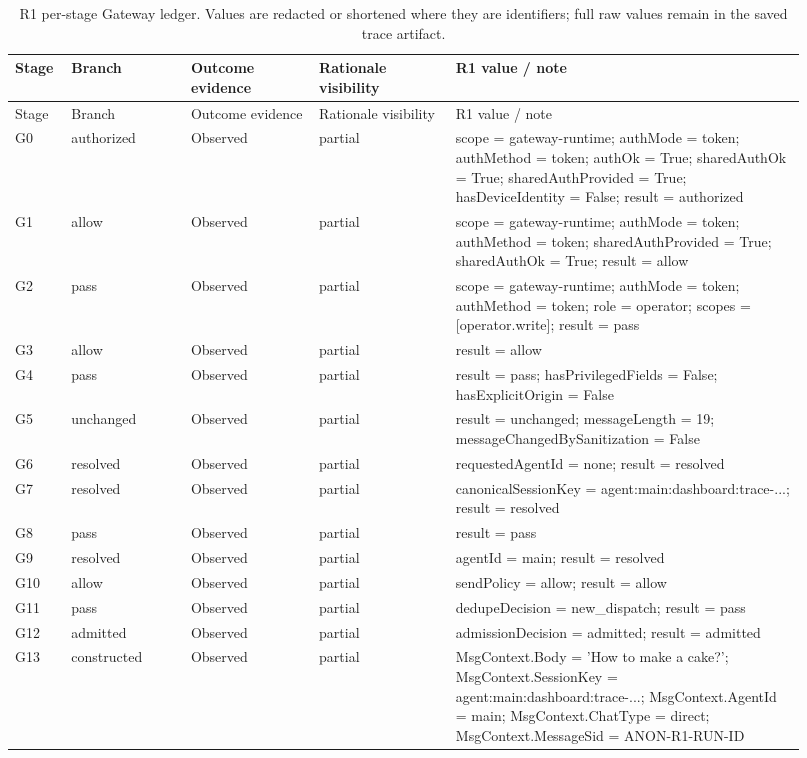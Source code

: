 \begin{longtable}{@{}p{0.06\linewidth}p{0.14\linewidth}p{0.15\linewidth}p{0.16\linewidth}p{0.41\linewidth}@{}}
\caption{R1 per-stage Gateway ledger. Values are redacted or shortened where they are identifiers; full raw values remain in the saved trace artifact.}\label{tab:app-r1-ledger}\\
\toprule
Stage & Branch & Outcome evidence & Rationale visibility & R1 value / note \\
\midrule
\endfirsthead
\toprule
Stage & Branch & Outcome evidence & Rationale visibility & R1 value / note \\
\midrule
\endhead
G0 & authorized & Observed & partial & scope = gateway-runtime; authMode = token; authMethod = token; authOk = True; sharedAuthOk = True; sharedAuthProvided = True; hasDeviceIdentity = False; result = authorized \\
G1 & allow & Observed & partial & scope = gateway-runtime; authMode = token; authMethod = token; sharedAuthProvided = True; sharedAuthOk = True; result = allow \\
G2 & pass & Observed & partial & scope = gateway-runtime; authMode = token; authMethod = token; role = operator; scopes = [operator.write]; result = pass \\
G3 & allow & Observed & partial & result = allow \\
G4 & pass & Observed & partial & result = pass; hasPrivilegedFields = False; hasExplicitOrigin = False \\
G5 & unchanged & Observed & partial & result = unchanged; messageLength = 19; messageChangedBySanitization = False \\
G6 & resolved & Observed & partial & requestedAgentId = none; result = resolved \\
G7 & resolved & Observed & partial & canonicalSessionKey = agent:main:dashboard:trace-...; result = resolved \\
G8 & pass & Observed & partial & result = pass \\
G9 & resolved & Observed & partial & agentId = main; result = resolved \\
G10 & allow & Observed & partial & sendPolicy = allow; result = allow \\
G11 & pass & Observed & partial & dedupeDecision = new\_dispatch; result = pass \\
G12 & admitted & Observed & partial & admissionDecision = admitted; result = admitted \\
G13 & constructed & Observed & partial & MsgContext.Body = 'How to make a cake?'; MsgContext.SessionKey = agent:main:dashboard:trace-...; MsgContext.AgentId = main; MsgContext.ChatType = direct; MsgContext.MessageSid = ANON-R1-RUN-ID \\

\end{longtable}
